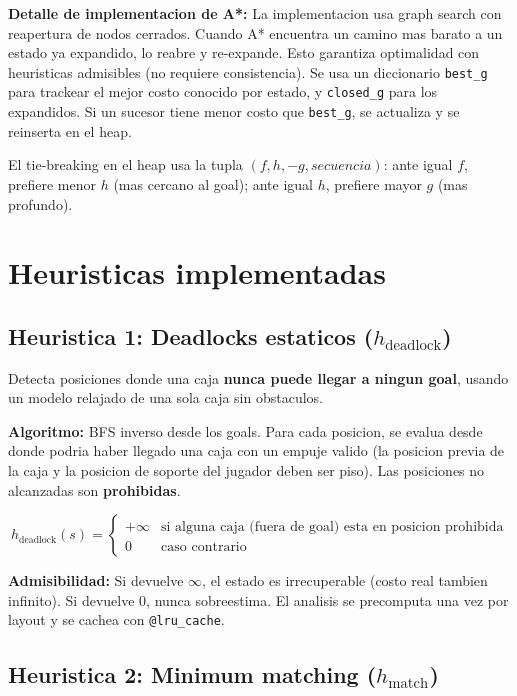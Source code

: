 \documentclass[12pt, a4paper]{article}
\begin{document}
\textbf{Detalle de implementacion de A*:} La implementacion usa graph search con reapertura de nodos cerrados. Cuando A* encuentra un camino mas barato a un estado ya expandido, lo reabre y re-expande. Esto garantiza optimalidad con heuristicas admisibles (no requiere consistencia). Se usa un diccionario \texttt{best\_g} para trackear el mejor costo conocido por estado, y \texttt{closed\_g} para los expandidos. Si un sucesor tiene menor costo que \texttt{best\_g}, se actualiza y se reinserta en el heap.

El tie-breaking en el heap usa la tupla $(f, h, -g, secuencia)$: ante igual $f$, prefiere menor $h$ (mas cercano al goal); ante igual $h$, prefiere mayor $g$ (mas profundo).

\section{Heuristicas implementadas}

\subsection{Heuristica 1: Deadlocks estaticos ($h_{\text{deadlock}}$)}

Detecta posiciones donde una caja \textbf{nunca puede llegar a ningun goal}, usando un modelo relajado de una sola caja sin obstaculos.

\textbf{Algoritmo:} BFS inverso desde los goals. Para cada posicion, se evalua desde donde podria haber llegado una caja con un empuje valido (la posicion previa de la caja y la posicion de soporte del jugador deben ser piso). Las posiciones no alcanzadas son \textbf{prohibidas}.

$$h_{\text{deadlock}}(s) = \begin{cases} +\infty & \text{si alguna caja (fuera de goal) esta en posicion prohibida} \\ 0 & \text{caso contrario} \end{cases}$$

\textbf{Admisibilidad:} Si devuelve $\infty$, el estado es irrecuperable (costo real tambien infinito). Si devuelve 0, nunca sobreestima. El analisis se precomputa una vez por layout y se cachea con \texttt{@lru\_cache}.

\subsection{Heuristica 2: Minimum matching ($h_{\text{match}}$)}
\end{document}
